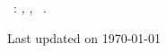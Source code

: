 \hfill
\vfill

\noindent\AuthorName\ \AuthorSurname: \textit{\Title,}
\DegreeName,
\textcopyright\ \CopyrightYear.
\noindent \par\hfill{\scriptsize\color{gray}Last updated on \today}
